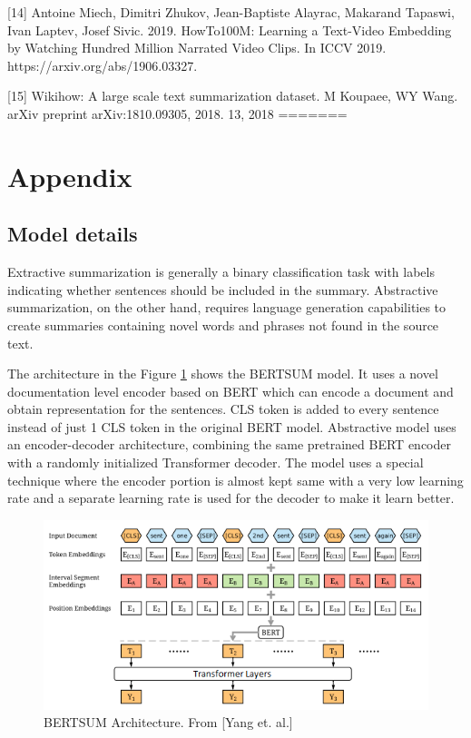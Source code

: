 \documentclass{article}
\begin{document}
[14] Antoine Miech, Dimitri Zhukov, Jean-Baptiste Alayrac, Makarand Tapaswi, Ivan Laptev, Josef Sivic. 2019. HowTo100M: Learning a Text-Video Embedding by Watching Hundred Million Narrated Video Clips. In ICCV 2019. https://arxiv.org/abs/1906.03327.
 
[15] Wikihow: A large scale text summarization dataset. M Koupaee, WY Wang. arXiv preprint arXiv:1810.09305, 2018. 13, 2018
=======

\section{Appendix}
\subsection{Model details}
Extractive summarization is generally a binary classification task with labels indicating whether sentences should be included in the summary. Abstractive summarization, on the other hand, requires language generation capabilities to create summaries containing novel words and phrases not found in the source text. 

The architecture in the Figure \ref{fig:architecure} shows the BERTSUM model. It uses a novel documentation level encoder based on BERT which can encode a document and obtain representation for the sentences. CLS token is added to every sentence instead of just 1 CLS token in the original BERT model. Abstractive model uses an encoder-decoder architecture, combining the same pretrained BERT encoder with a randomly initialized Transformer decoder. The model uses a special technique where the encoder portion is almost kept same with a very low learning rate and a separate learning rate is used for the decoder to make it learn better. 

\begin{figure}[H]
  \centering
  \includegraphics[scale=0.5]{bertsumarchitecture.png}
  \caption{BERTSUM Architecture. From [Yang et. al.]}
  \label{fig:architecure}
\end{figure}
\end{document}
